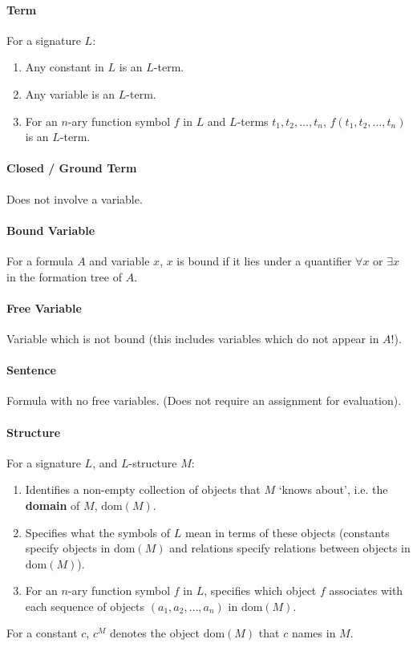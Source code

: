 \documentclass[10pt,twoside,twocolumn]{article}
\begin{document}
\paragraph{Term}

For a signature $L$:
\begin{enumerate}
\item Any constant in $L$ is an $L$-term.
\item Any variable is an $L$-term.
\item For an $n$-ary function symbol $f$ in $L$ and $L$-terms $t_{1},t_{2},\dots,t_{n}$,
$f\left(t_{1},t_{2},\dots,t_{n}\right)$ is an $L$-term.
\end{enumerate}

\paragraph{Closed / Ground Term}

Does not involve a variable.


\paragraph{Bound Variable}

For a formula $A$ and variable $x$, $x$ is bound if it lies under
a quantifier $\forall x$ or $\exists x$ in the formation tree of
$A$.


\paragraph{Free Variable}

Variable which is not bound (this includes variables which do not
appear in $A$!).


\paragraph{Sentence}

Formula with no free variables. (Does not require an assignment for
evaluation).


\paragraph{Structure}

For a signature $L$, and $L$-structure $M$:
\begin{enumerate}
\item Identifies a non-empty collection of objects that $M$ `knows about',
i.e. the \textbf{domain} of $M$, $\mbox{dom}\left(M\right)$.
\item Specifies what the symbols of $L$ mean in terms of these objects
(constants specify objects in $\mbox{dom}\left(M\right)$ and relations
specify relations between objects in $\mbox{dom}\left(M\right)$).
\item For an $n$-ary function symbol $f$ in $L$, specifies which object
$f$ associates with each sequence of objects $\left(a_{1},a_{2},\dots,a_{n}\right)$
in $\mbox{dom}\left(M\right)$.
\end{enumerate}
For a constant $c$, $c^{M}$ denotes the object $\mbox{dom}\left(M\right)$
that $c$ names in $M$.
\end{document}
